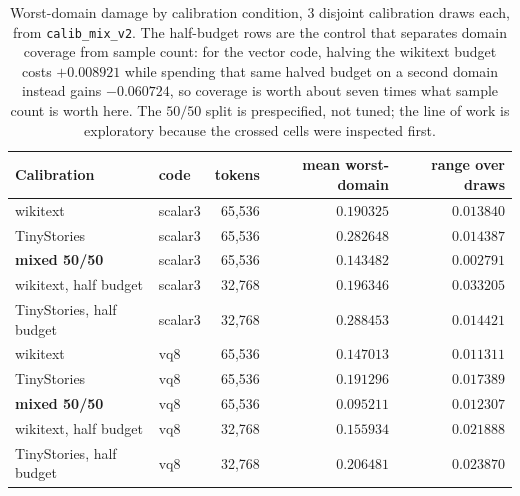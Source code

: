 \begin{table}[t]
\centering
\small
\begin{tabular}{llrrr}
\toprule
Calibration & code & tokens & mean worst-domain & range over draws \\
\midrule
wikitext & scalar3 & 65,536 & $0.190325$ & $0.013840$ \\
TinyStories & scalar3 & 65,536 & $0.282648$ & $0.014387$ \\
\textbf{mixed 50/50} & scalar3 & 65,536 & $0.143482$ & $0.002791$ \\
wikitext, half budget & scalar3 & 32,768 & $0.196346$ & $0.033205$ \\
TinyStories, half budget & scalar3 & 32,768 & $0.288453$ & $0.014421$ \\
\midrule
wikitext & vq8 & 65,536 & $0.147013$ & $0.011311$ \\
TinyStories & vq8 & 65,536 & $0.191296$ & $0.017389$ \\
\textbf{mixed 50/50} & vq8 & 65,536 & $0.095211$ & $0.012307$ \\
wikitext, half budget & vq8 & 32,768 & $0.155934$ & $0.021888$ \\
TinyStories, half budget & vq8 & 32,768 & $0.206481$ & $0.023870$ \\
\bottomrule
\end{tabular}
\caption{Worst-domain damage by calibration condition, 3 disjoint calibration draws each, from \texttt{calib\_mix\_v2}. The half-budget rows are the control that separates domain coverage from sample count: for the vector code, halving the wikitext budget costs $+0.008921$ while spending that same halved budget on a second domain instead gains $-0.060724$, so coverage is worth about seven times what sample count is worth here. The $50/50$ split is prespecified, not tuned; the line of work is exploratory because the crossed cells were inspected first.}
\label{tab:mixture}
\end{table}
